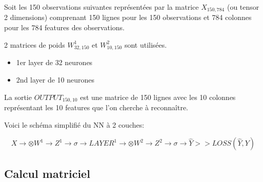 \documentclass[11pt]{book}
\begin{document}
Soit les 150 observations suivantes représentées par la matrice $X_{150,784}$ (ou tensor 2 dimensions) comprenant 150 lignes pour les 150 observations et 784 colonnes pour les 784 features des observations.

2 matrices de poids $W^1_{32,150}$ et $W^2_{10,150}$ sont utilisées.

\begin{itemize}
	\item 1er layer de 32 neurones
	\item 2nd layer de 10 neurones
\end{itemize}

La sortie $OUTPUT_{150,10}$ est une matrice de 150 lignes avec les 10 colonnes représentant 
les 10 features que l'on cherche à reconnaître.

Voici le schéma simplifié du NN à 2 couches:

$$
X \longrightarrow \otimes W^1 \rightarrow  Z^1 \rightarrow \sigma \rightarrow LAYER^1 \longrightarrow
\otimes W^2 
\rightarrow Z^2 
\rightarrow 
\sigma 
\rightarrow \hat{Y} 
>> LOSS(\hat{Y}, Y)
$$

\subsection{Calcul matriciel}
\end{document}

